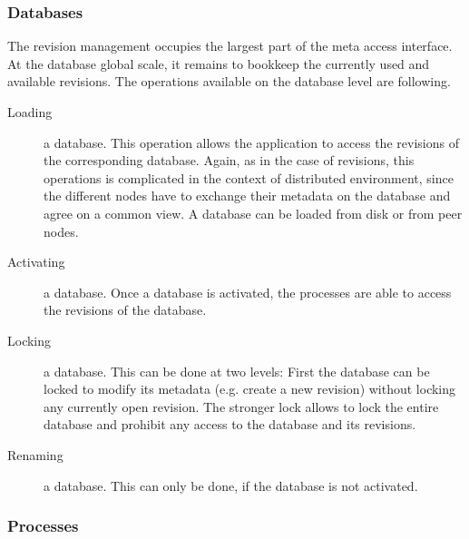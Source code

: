 \documentclass[a4paper, 10pt]{book}
\begin{document}
                                \subsubsection{Databases}

                                The revision management occupies the largest part of the meta access
                                interface. At the database global scale, it remains to bookkeep the
                                currently used and available revisions. The operations available on
                                the database level are following.
                                \begin{description}
                                    \item[Loading] a database. This operation allows the application to
                                        access the revisions of the corresponding database. Again, as in the
                                        case of revisions, this operations is complicated in the context of
                                        distributed environment, since the different nodes have to exchange
                                        their metadata on the database and agree on a common view. 
                                        A database can be loaded from disk or from peer nodes. 
                                    \item[Activating] a database. Once a database is activated, the
                                        processes are able to access the revisions of the database. 
                                    \item[Locking] a database. This can be done at two levels: First the
                                        database can be locked to modify its metadata (e.g. create a new
                                        revision) without locking any currently open revision. The stronger
                                        lock allows to lock the entire database and prohibit any access to
                                        the database and its revisions.
                                    \item[Renaming] a database. This can only be done, if the database is
                                        not activated. 
                                \end{description}


                                \subsubsection{Processes}
                                \label{sec:processes}
\end{document}
